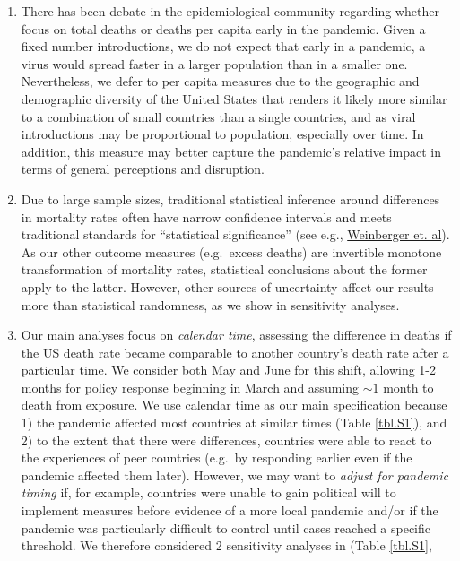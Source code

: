 \documentclass[
]{article}
\providecommand{\tightlist}{%
  \setlength{\itemsep}{0pt}\setlength{\parskip}{0pt}}
\begin{document}
\begin{enumerate}
\def\labelenumi{\arabic{enumi}.}
\tightlist
\item
  There has been debate in the epidemiological community regarding
  whether focus on total deaths or deaths per capita early in the
  pandemic. Given a fixed number introductions, we do not expect that
  early in a pandemic, a virus would spread faster in a larger
  population than in a smaller one. Nevertheless, we defer to per capita
  measures due to the geographic and demographic diversity of the United
  States that renders it likely more similar to a combination of small
  countries than a single countries, and as viral introductions may be
  proportional to population, especially over time. In addition, this
  measure may better capture the pandemic's relative impact in terms of
  general perceptions and disruption.
\item
  Due to large sample sizes, traditional statistical inference around
  differences in mortality rates often have narrow confidence intervals
  and meets traditional standards for ``statistical significance'' (see
  e.g.,
  \href{https://jamanetwork.com/journals/jamainternalmedicine/fullarticle/2767980}{Weinberger et. al}).
  As our other outcome measures (e.g.~excess deaths) are invertible
  monotone transformation of mortality rates, statistical conclusions
  about the former apply to the latter. However, other sources of
  uncertainty affect our results more than statistical randomness, as we
  show in sensitivity analyses.
\item
  Our main analyses focus on \emph{calendar time}, assessing the
  difference in deaths if the US death rate became comparable to another
  country's death rate after a particular time. We consider both May and
  June for this shift, allowing 1-2 months for policy response beginning
  in March and assuming \(\sim 1\) month to death from exposure. We use
  calendar time as our main specification because 1) the pandemic
  affected most countries at similar times (Table \ref{tbl.S1}), and 2)
  to the extent that there were differences, countries were able to
  react to the experiences of peer countries (e.g.~by responding earlier
  even if the pandemic affected them later). However, we may want to
  \emph{adjust for pandemic timing} if, for example, countries were
  unable to gain political will to implement measures before evidence of
  a more local pandemic and/or if the pandemic was particularly
  difficult to control until cases reached a specific threshold. We
  therefore considered 2 sensitivity analyses in (Table \ref{tbl.S1},

\end{enumerate}
\end{document}
